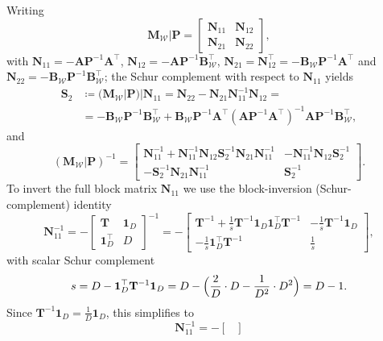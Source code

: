 \documentclass[a4paper,12pt,openany]{book}
\newcommand{\A}{\mathbf{A}}
\newcommand{\B}{\mathbf{B}}
\newcommand{\M}{\mathbf{M}}
\newcommand{\N}{\mathbf{N}}
\renewcommand{\P}{\mathbf{P}}
\newcommand{\T}{\mathbf{T}}
\begin{document}
\begin{appendices}
Writing
\begin{equation}
	\M_\mathcal{W}|\P=\begin{bmatrix}\N_{11} & \N_{12}\\[2pt] \N_{21} & \N_{22}\end{bmatrix},
\end{equation}
with $\N_{11}=-\A\P^{-1}\A^\top$, $\N_{12}=-\A\P^{-1}\B_\mathcal{W}^\top$, $\N_{21}=\N_{12}^\top=-\B_\mathcal{W}\P^{-1}\A^\top$ and $\N_{22}=-\B_\mathcal{W}\P^{-1}\B_\mathcal{W}^\top$; the Schur complement with respect to $\N_{11}$ yields
\begin{align}
	\mathbf{S}_2 &\coloneqq (\M_\mathcal{W}|\P)|\N_{11} = \N_{22}-\N_{21}\N_{11}^{-1}\N_{12}
	= \\ 
	&= -\B_\mathcal{W}\P^{-1}\B_\mathcal{W}^\top + \B_\mathcal{W}\P^{-1}\A^\top(\A\P^{-1}\A^\top)^{-1}\A\P^{-1}\B_\mathcal{W}^\top , \nonumber
\end{align}
and
\begin{equation}\label{eq:MwP_inv_block}
	(\M_\mathcal{W}|\P)^{-1}
	=
	\begin{bmatrix}
		\N_{11}^{-1}+\N_{11}^{-1}\N_{12}\mathbf{S}_2^{-1}\N_{21}\N_{11}^{-1} & -\N_{11}^{-1}\N_{12}\mathbf{S}_2^{-1}\\[4pt]
		-\mathbf{S}_2^{-1}\N_{21}\N_{11}^{-1} & \mathbf{S}_2^{-1}
	\end{bmatrix}.
\end{equation}
To invert the full block matrix $\N_{11}$ we use the block-inversion (Schur-complement) identity
\begin{equation}
	\N_{11}^{-1}=-\begin{bmatrix}\T&\mathbf{1}_D\\ \mathbf{1}_D^\top&D\end{bmatrix}^{-1}
	=
	-\begin{bmatrix}
		\T^{-1}+\frac{1}{s}\T^{-1}\mathbf{1}_D\mathbf{1}_D^\top\T^{-1} & -\frac{1}{s}\T^{-1}\mathbf{1}_D\\[4pt]
		-\frac{1}{s}\mathbf{1}_D^\top\T^{-1} & \frac{1}{s}
	\end{bmatrix},
\end{equation}
with scalar Schur complement
\begin{equation}
	s = D-\mathbf{1}_D^\top\T^{-1}\mathbf{1}_D
	= D-\Bigl(\frac{2}{D}\cdot D-\frac{1}{D^2}\cdot D^2\Bigr)
	= D-1.
\end{equation}
Since $\T^{-1}\mathbf{1}_D=\tfrac{1}{D}\mathbf{1}_D$, this simplifies to
\begin{equation}
	\N_{11}^{-1}
	=
	-\begin{bmatrix}

\end{bmatrix}
\end{equation}
\end{appendices}
\end{document}
